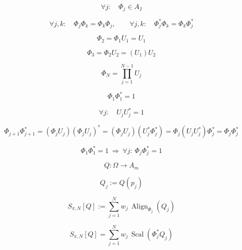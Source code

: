 \documentclass[12pt]{article}
\begin{document}
\begin{equation}
\forall j:\quad \Phi_j\in A_{\mathsf{J}}
\end{equation}

\begin{equation}
\forall j,k:\quad \Phi_j\Phi_k=\Phi_k\Phi_j,\qquad
\forall j,k:\quad \Phi_j^{*}\Phi_k=\Phi_k\Phi_j^{*}
\end{equation}

\begin{equation}
\Phi_2=\Phi_1 U_1=U_1
\end{equation}

\begin{equation}
\Phi_3=\Phi_2 U_2=(U_1)U_2
\end{equation}

\begin{equation}
\Phi_N=\prod_{j=1}^{N-1}U_j
\end{equation}

\begin{equation}
\Phi_1\Phi_1^{*}=1
\end{equation}

\begin{equation}
\forall j:\quad U_j U_j^{*}=1
\end{equation}

\begin{equation}
\Phi_{j+1}\Phi_{j+1}^{*}=(\Phi_j U_j)(\Phi_j U_j)^{*}=(\Phi_j U_j)(U_j^{*}\Phi_j^{*})=\Phi_j(U_j U_j^{*})\Phi_j^{*}=\Phi_j\Phi_j^{*}
\end{equation}

\begin{equation}
\Phi_1\Phi_1^{*}=1\ \Longrightarrow\ \forall j:\ \Phi_j\Phi_j^{*}=1
\end{equation}

\begin{equation}
Q:\Omega\to A_m
\end{equation}

\begin{equation}
Q_j:=Q(p_j)
\end{equation}

\begin{equation}
S_{\pi,N}[Q]:=\sum_{j=1}^N w_j\,\operatorname{Align}_{\Phi_j}(Q_j)
\end{equation}

\begin{equation}
S_{\pi,N}[Q]=\sum_{j=1}^N w_j\,\operatorname{Scal}(\Phi_j^{*}Q_j)
\end{equation}
\end{document}

